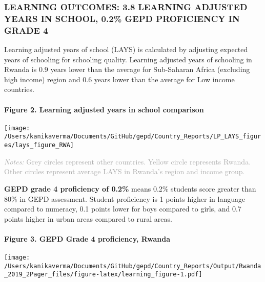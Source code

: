 \documentclass[twocolumn]{article}
\let\oldparagraph\paragraph
\renewcommand{\paragraph}[1]{\oldparagraph{#1}\mbox{}}
\begin{document}
\hypertarget{learning-outcomes-3.8-learning-adjusted-years-in-school-0.2-gepd-proficiency-in-grade-4}{%
\subsubsection{\texorpdfstring{\textbf{LEARNING OUTCOMES: 3.8 LEARNING
ADJUSTED YEARS IN SCHOOL, 0.2\% GEPD PROFICIENCY IN GRADE
4}}{LEARNING OUTCOMES: 3.8 LEARNING ADJUSTED YEARS IN SCHOOL, 0.2\% GEPD PROFICIENCY IN GRADE 4}}\label{learning-outcomes-3.8-learning-adjusted-years-in-school-0.2-gepd-proficiency-in-grade-4}}

Learning adjusted years of school (LAYS) is calculated by adjusting
expected years of schooling for schooling quality. Learning adjusted
years of schooling in Rwanda is 0.9 years lower than the average for
Sub-Saharan Africa (excluding high income) region and 0.6 years lower
than the average for Low income countries.

\hypertarget{figure-2.-learning-adjusted-years-in-school-comparison}{%
\paragraph{Figure 2. Learning adjusted years in school
comparison}\label{figure-2.-learning-adjusted-years-in-school-comparison}}

\texttt{[image: /Users/kanikaverma/Documents/GitHub/gepd/Country\_Reports/LP\_LAYS\_figures/lays\_figure\_RWA]}

{\scriptsize
    \textcolor{darkgray}{\textit{Notes:} Grey circles represent other countries. Yellow circle represents Rwanda. Other circles represent average LAYS in Rwanda's region and income group.}
  }

\textbf{GEPD grade 4 proficiency of 0.2\%} means 0.2\% students score
greater than 80\% in GEPD assessment. Student proficiency is 1 points
higher in language compared to numeracy, 0.1 points lower for boys
compared to girls, and 0.7 points higher in urban areas compared to
rural areas.

\hypertarget{figure-3.-gepd-grade-4-proficiency-rwanda}{%
\paragraph{Figure 3. GEPD Grade 4 proficiency,
Rwanda}\label{figure-3.-gepd-grade-4-proficiency-rwanda}}

\texttt{[image: /Users/kanikaverma/Documents/GitHub/gepd/Country\_Reports/Output/Rwanda\_2019\_2Pager\_files/figure-latex/learning\_figure-1.pdf]}
\end{document}
